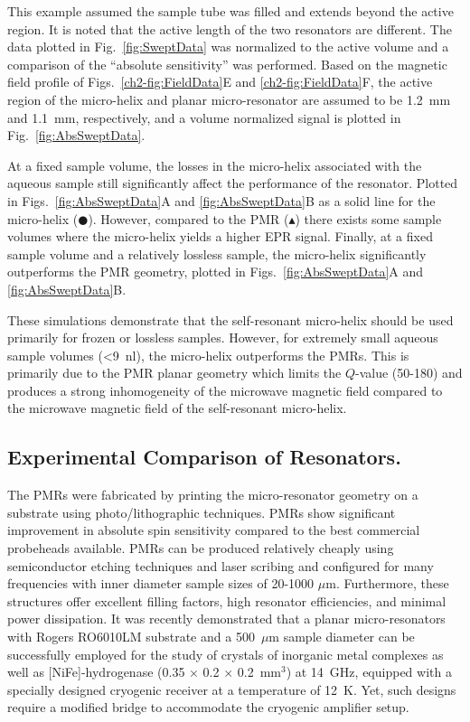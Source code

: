 This example assumed the sample tube was filled and extends beyond the active region. It is noted that the active length of the two resonators are different. The data plotted in Fig.~\ref{fig:SweptData} was normalized to the active volume and a comparison of the ``absolute sensitivity'' was performed. Based on the magnetic field profile of  Figs.~\ref{ch2-fig:FieldData}E and \ref{ch2-fig:FieldData}F, the active region of the micro-helix and planar micro-resonator are assumed to be 1.2~mm and 1.1~mm, respectively, and a volume normalized signal is plotted in Fig.~\ref{fig:AbsSweptData}. 

At a fixed sample volume, the losses in the micro-helix associated with the aqueous sample still significantly affect the performance of the resonator.  Plotted in Figs.~\ref{fig:AbsSweptData}A and \ref{fig:AbsSweptData}B as a solid line for the micro-helix ($\CIRCLE$). However, compared to the PMR ($\blacktriangle$) there exists some sample volumes where the micro-helix yields a higher EPR signal. Finally, at a fixed sample volume and a relatively lossless sample, the micro-helix significantly outperforms the PMR geometry, plotted in Figs.~\ref{fig:AbsSweptData}A and \ref{fig:AbsSweptData}B.

These simulations demonstrate that the self-resonant micro-helix should be used primarily for frozen or lossless samples. However, for extremely small aqueous sample volumes (<9~nl), the micro-helix outperforms the PMRs. This is primarily due to the PMR planar geometry which limits the $Q$-value (50-180) and produces a strong inhomogeneity of the microwave magnetic field compared to the microwave magnetic field of the self-resonant micro-helix. 

\subsection{Experimental Comparison of Resonators.}
The PMRs were fabricated by printing the micro-resonator geometry on a substrate using photo\-/lithographic techniques. \cite{Suter2005, Suter2008, suter2015} PMRs show significant improvement in absolute spin sensitivity compared to the best commercial probeheads available. \cite{ ReijerseSavitsky2017} PMRs can be produced relatively cheaply using semiconductor etching techniques and laser scribing and configured for many frequencies with inner diameter sample sizes of 20-1000 $\mu$m. Furthermore, these structures offer excellent filling factors, high resonator efficiencies, and minimal power dissipation. It was recently demonstrated that a planar micro-resonators with Rogers RO6010LM substrate and a 500~$\mu$m sample diameter can be successfully employed for the study of crystals of inorganic metal complexes as well as [NiFe]-hydrogenase (0.35 $\times$ 0.2 $\times$ 0.2~mm$^3$) at 14~GHz, equipped with a specially designed cryogenic receiver at a temperature of 12~K. \cite{NARKOWICZ201379} Yet, such designs require a modified bridge to accommodate the cryogenic amplifier setup.

